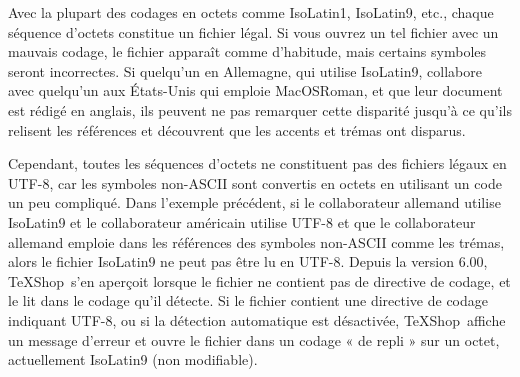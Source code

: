 \documentclass[11pt,french]{article}
\newcommand{\TS}{\textsf{\TeX Shop}}
\newcommand{\acr}[1]{\textsf{#1}}
\begin{document}
Avec la plupart des codages en octets comme \acr{IsoLatin1}, \acr{IsoLatin9}, etc., chaque séquence d'octets constitue un fichier légal. Si vous ouvrez un tel fichier avec un mauvais codage, le fichier apparaît comme d'habitude, mais certains symboles seront incorrectes. Si quelqu'un en Allemagne, qui utilise \acr{IsoLatin9}, collabore avec quelqu'un aux États-Unis qui emploie \acr{MacOSRoman}, et que leur document est rédigé en anglais, ils peuvent ne pas remarquer cette disparité jusqu'à ce qu'ils relisent les références et découvrent que les accents et trémas ont disparus.

Cependant, toutes les séquences d'octets ne constituent pas des fichiers légaux en \acr{UTF-8}, car les symboles non-\acr{ASCII} sont convertis en octets en utilisant un code un peu compliqué. Dans l'exemple précédent, si le collaborateur allemand utilise \acr{IsoLatin9} et le collaborateur américain utilise \mbox{\acr{UTF-8}} et que le collaborateur allemand emploie dans les références des symboles non-\acr{ASCII} comme les trémas, alors le fichier \acr{IsoLatin9} ne peut pas être lu en \acr{UTF-8}. Depuis la version 6.00, \TS\ s'en aperçoit lorsque le fichier ne contient pas de directive de codage, et le lit dans le codage qu'il détecte. Si le fichier contient une directive de codage indiquant \acr{UTF-8}, ou si la détection automatique est désactivée, \TS\ affiche un message d'erreur et ouvre le fichier dans un codage « de repli » sur un octet, actuellement \acr{IsoLatin9} (non modifiable).%
\end{document}
